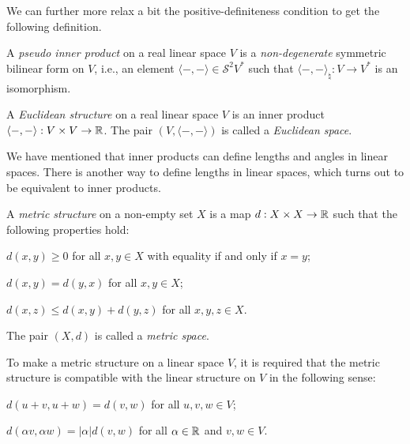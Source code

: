 We can further more relax a bit the positive-definiteness condition to get the following definition.
\begin{definition}\label{def:pseudo_inner_product}
	A \emph{pseudo inner product} on a real linear space $V$ is a \emph{non-degenerate} symmetric bilinear form on $V$, i.e., an element $\langle-, -\rangle \in \mathcal{S}^2 V^*$ such that $\langle-, -\rangle_{\natural} : V \to V^*$ is an isomorphism.
\end{definition}

\begin{definition}\label{def:euclidean_space}
	A \emph{Euclidean structure} on a real linear space $V$ is an inner product $\langle -, - \rangle : V \times V \to \operatorname{\mathbb{R}}$. The pair $(V, \langle -, - \rangle)$ is called a \emph{Euclidean space}.
\end{definition}

We have mentioned that inner products can define lengths and angles in linear spaces. There is another way to define lengths in linear spaces, which turns out to be equivalent to inner products.

\begin{definition}\label{def:metric_structure}
	A \emph{metric structure} on a non-empty set $X$ is a map $d : X \times X \to \operatorname{\mathbb{R}}$ such that the following properties hold:
	\begin{description}[labelwidth=\widthof{\bfseries Positive-definiteness:~}]
		\item[Positive-definiteness] $d(x, y) \geq 0$ for all $x, y \in X$ with equality if and only if $x = y$;
		\item[Symmetry] $d(x, y) = d(y, x)$ for all $x, y \in X$;
		\item[Triangle inequality] $d(x, z) \leq d(x, y) + d(y, z)$ for all $x, y, z \in X$.
	\end{description}
	The pair $(X, d)$ is called a \emph{metric space}.
\end{definition}

To make a metric structure on a linear space $V$, it is required that the metric structure is compatible with the linear structure on $V$ in the following sense:
\begin{description}[leftmargin=!, labelwidth=\widthof{\bfseries Translation invariance:~}, font=\color{ustblue}, topsep=\baselineskip]
	\item[Translation invariance] $d(u + v, u + w) = d(v, w)$ for all $u, v, w \in V$;
	\item[Homogeneity] $d(\alpha v, \alpha w) = |\alpha| d(v, w)$ for all $\alpha \in \operatorname{\mathbb{R}}$ and $v, w \in V$.
\end{description}

